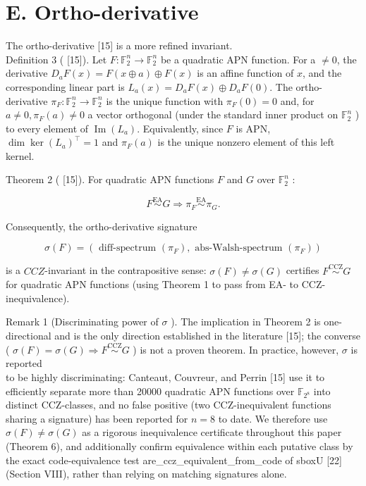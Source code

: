 \documentclass[10pt]{article}
\begin{document}
\section*{E. Ortho-derivative}
The ortho-derivative [15] is a more refined invariant.\\[0pt]
Definition 3 ( [15]). Let $F: \mathbb{F}_{2}^{n} \rightarrow \mathbb{F}_{2}^{n}$ be a quadratic APN function. For a $\neq 0$, the derivative $D_{a} F(x)=F(x \oplus a) \oplus F(x)$ is an affine function of $x$, and the corresponding linear part is $L_{a}(x)=D_{a} F(x) \oplus D_{a} F(0)$. The ortho-derivative $\pi_{F}: \mathbb{F}_{2}^{n} \rightarrow \mathbb{F}_{2}^{n}$ is the unique function with $\pi_{F}(0)=0$ and, for $a \neq 0, \pi_{F}(a) \neq 0$ a vector orthogonal (under the standard inner product on $\mathbb{F}_{2}^{n}$ ) to every element of $\operatorname{Im}\left(L_{a}\right)$. Equivalently, since $F$ is APN, $\operatorname{dim} \operatorname{ker}\left(L_{a}\right)^{\top}=1$ and $\pi_{F}(a)$ is the unique nonzero element of this left kernel.

Theorem 2 ( [15]). For quadratic APN functions $F$ and $G$ over $\mathbb{F}_{2}^{n}$ :

$$
F \stackrel{\mathrm{EA}}{\sim} G \Longrightarrow \pi_{F} \stackrel{\mathrm{EA}}{\sim} \pi_{G} .
$$

Consequently, the ortho-derivative signature

$$
\sigma(F)=\left(\text { diff-spectrum }\left(\pi_{F}\right), \text { abs-Walsh-spectrum }\left(\pi_{F}\right)\right)
$$

is a $C C Z$-invariant in the contrapositive sense: $\sigma(F) \neq \sigma(G)$ certifies $F \stackrel{\mathrm{CCZ}}{\sim} G$ for quadratic APN functions (using Theorem 1 to pass from EA- to CCZ-inequivalence).

Remark 1 (Discriminating power of $\sigma$ ). The implication in Theorem 2 is one-directional and is the only direction established in the literature [15]; the converse ( $\sigma(F)=\sigma(G) \Rightarrow F \stackrel{\mathrm{CCZ}}{\sim} G$ ) is not a proven theorem. In practice, however, $\sigma$ is reported\\[0pt]
to be highly discriminating: Canteaut, Couvreur, and Perrin [15] use it to efficiently separate more than 20000 quadratic APN functions over $\mathbb{F}_{2^{8}}$ into distinct CCZ-classes, and no false positive (two CCZ-inequivalent functions sharing a signature) has been reported for $n=8$ to date. We therefore use $\sigma(F) \neq \sigma(G)$ as a rigorous inequivalence certificate throughout this paper (Theorem 6), and additionally confirm equivalence within each putative class by the exact code-equivalence test are\_ccz\_equivalent\_from\_code of sboxU [22] (Section VIII), rather than relying on matching signatures alone.
\end{document}
